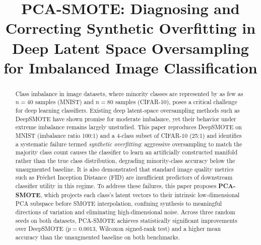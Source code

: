 \documentclass[conference]{IEEEtran}
\begin{document}
\title{PCA-SMOTE: Diagnosing and Correcting Synthetic Overfitting in Deep Latent Space Oversampling for Imbalanced Image Classification}

\author{
\IEEEauthorblockN{~}
\IEEEauthorblockA{~\\
~ \\
~}
\and
\IEEEauthorblockN{~}
\IEEEauthorblockA{~\\
~ \\
~}
\and
\IEEEauthorblockN{~}
\IEEEauthorblockA{~\\
~ \\
~}
\and
\IEEEauthorblockN{~}
\IEEEauthorblockA{~\\
~ \\
~}
}

\maketitle

\begin{abstract}
Class imbalance in image datasets, where minority classes are represented by as few as
$n = 40$ samples (MNIST) and $n = 80$ samples (CIFAR-10), poses a critical challenge for deep learning classifiers.
Existing deep latent-space oversampling methods such as DeepSMOTE have shown promise
for moderate imbalance, yet their behavior under extreme imbalance remains largely unstudied.
This paper reproduces DeepSMOTE on MNIST (imbalance ratio 100:1) and a 4-class
subset of CIFAR-10 (25:1) and identifies a systematic failure termed
\emph{synthetic overfitting}: aggressive oversampling to match the majority class count
causes the classifier to learn an artificially constructed manifold rather than the true
class distribution, degrading minority-class accuracy below the unaugmented baseline.
It is also demonstrated that standard image quality metrics such as
Fr\'{e}chet Inception Distance (FID) are insufficient predictors of downstream
classifier utility in this regime.
To address these failures, this paper proposes \textbf{PCA-SMOTE}, which projects
each class's latent vectors to their intrinsic low-dimensional PCA subspace before
SMOTE interpolation, confining synthesis to meaningful directions of variation and
eliminating high-dimensional noise.
Across three random seeds on both datasets, PCA-SMOTE achieves statistically
significant improvements over DeepSMOTE ($p = 0.0013$, Wilcoxon signed-rank
test) and a higher mean accuracy than the unaugmented baseline on both benchmarks.
\end{abstract}
\end{document}

